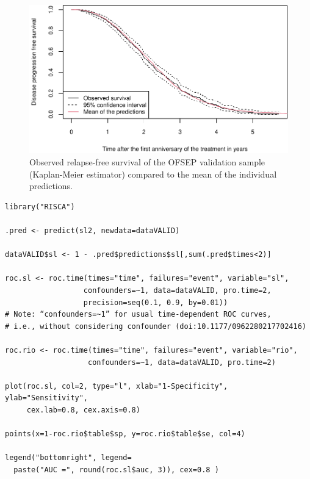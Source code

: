 \begin{figure}
\includegraphics[width=1\linewidth]{RJ-2024-037_files/figure-latex/calibfig3-1} \caption{Observed relapse-free survival of the OFSEP validation sample (Kaplan-Meier estimator) compared to the mean of the individual predictions.}\label{fig:calibfig3}
\end{figure}

\clearpage

\begin{verbatim}
library("RISCA")

.pred <- predict(sl2, newdata=dataVALID)

dataVALID$sl <- 1 - .pred$predictions$sl[,sum(.pred$times<2)]

roc.sl <- roc.time(times="time", failures="event", variable="sl",
                  confounders=~1, data=dataVALID, pro.time=2,
                  precision=seq(0.1, 0.9, by=0.01)) 
# Note: “confounders=~1” for usual time-dependent ROC curves,
# i.e., without considering confounder (doi:10.1177/0962280217702416)

roc.rio <- roc.time(times="time", failures="event", variable="rio",
                   confounders=~1, data=dataVALID, pro.time=2)

plot(roc.sl, col=2, type="l", xlab="1-Specificity", ylab="Sensitivity",
     cex.lab=0.8, cex.axis=0.8)

points(x=1-roc.rio$table$sp, y=roc.rio$table$se, col=4)

legend("bottomright", legend=
  paste("AUC =", round(roc.sl$auc, 3)), cex=0.8 )
\end{verbatim}

